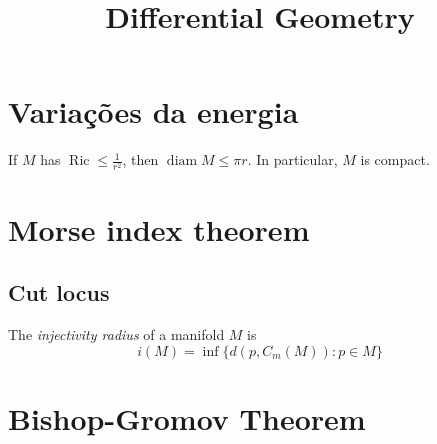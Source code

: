 



\title{Differential Geometry}
\maketitle

\label{section-phantom}

\tableofcontents

\section{Variações da energia}
\label{section-variações-energia}

\begin{theorem}
\label{theorem-bonnet-myers}
If $M$ has  $\operatorname{Ric} \leq \frac{1}{r^2}$, then
$\operatorname{diam}M\leq \pi r$. In particular, $M$ is compact.
\end{theorem}

\section{Morse index theorem}
\label{section-morse-index}

\subsection{Cut locus}
\label{subsection-cut-locus}

\begin{definition}
\label{definition-injectivity-radius}
The {\it injectivity radius} of a manifold $M$ is
$$
i(M)=\operatorname{inf}\{d(p,C_m(M)):p \in M\}
$$
\end{definition}

\section{Bishop-Gromov Theorem}
\label{section-bishop-gromov}

\begin{theorem}
\label{theorem-bishop-gromov}

\end{theorem}

